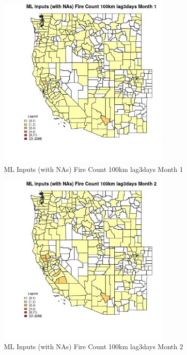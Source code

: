 \begin{figure} 
\centering  
\includegraphics[width=0.77\textwidth]{Code_Outputs/Report_ML_input_PM25_Step4_part_e_de_duplicated_aves_compiled_2019-05-21wNAs_CountyFire_Count_100km_lag3daysmedianMonth1.jpg} 
\caption{\label{fig:Report_ML_input_PM25_Step4_part_e_de_duplicated_aves_compiled_2019-05-21wNAsCountyFire_Count_100km_lag3daysmedianMonth1}ML Inputs (with NAs) Fire Count 100km lag3days Month 1} 
\end{figure} 
 

\begin{figure} 
\centering  
\includegraphics[width=0.77\textwidth]{Code_Outputs/Report_ML_input_PM25_Step4_part_e_de_duplicated_aves_compiled_2019-05-21wNAs_CountyFire_Count_100km_lag3daysmedianMonth2.jpg} 
\caption{\label{fig:Report_ML_input_PM25_Step4_part_e_de_duplicated_aves_compiled_2019-05-21wNAsCountyFire_Count_100km_lag3daysmedianMonth2}ML Inputs (with NAs) Fire Count 100km lag3days Month 2} 
\end{figure} 
 

